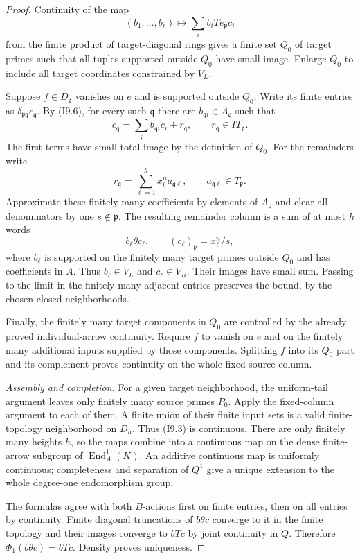 \begin{proof}
Continuity of the map
\[
 (b_1,\ldots,b_r)\longmapsto
          \sum_i b_i T e_{\mathfrak p}c_i
\]
from the finite product of target-diagonal rings gives a finite
set $Q_0$ of target primes such that all tuples supported outside
$Q_0$ have small image. Enlarge $Q_0$ to include all target
coordinates constrained by $V_L$.

Suppose $f\in D_{\mathfrak p}$ vanishes on $e$ and is supported
outside $Q_0$. Write its finite entries as
$\delta_{\mathfrak p\mathfrak q}c_{\mathfrak q}$.
By (I9.6), for every such $\mathfrak q$ there are
$b_{\mathfrak q i}\in A_{\mathfrak q}$ such that
\[
 c_{\mathfrak q}
    =\sum_i b_{\mathfrak q i}c_i+r_{\mathfrak q},
 \qquad r_{\mathfrak q}\in IT_{\mathfrak p}.              \tag{I9.7}
\]
The first terms have small total image by the definition of $Q_0$.
For the remainders write
\[
 r_{\mathfrak q}=\sum_{\ell=1}^h x_\ell^n a_{\mathfrak q\ell},
 \qquad a_{\mathfrak q\ell}\in T_{\mathfrak p}.
\]
Approximate these finitely many coefficients by elements of
$A_{\mathfrak p}$ and clear all denominators by one $s\notin
\mathfrak p$. The resulting remainder column is a sum of at most
$h$ words
\[
             b_\ell\theta c_\ell,\qquad
 (c_\ell)_{\mathfrak p}=x_\ell^n/s,
\]
where $b_\ell$ is supported on the finitely many target primes
outside $Q_0$ and has coefficients in $A$. Thus $b_\ell\in V_L$
and $c_\ell\in V_R$. Their images have small sum. Passing to the
limit in the finitely many adjacent entries preserves the bound,
by the chosen closed neighborhoods.

Finally, the finitely many target components in $Q_0$ are controlled
by the already proved individual-arrow continuity. Require $f$ to
vanish on $e$ and on the finitely many additional inputs supplied
by those components. Splitting $f$ into its $Q_0$ part and its
complement proves continuity on the whole fixed source column.

\emph{Assembly and completion.}
For a given target neighborhood, the uniform-tail argument leaves
only finitely many source primes $P_0$. Apply the fixed-column
argument to each of them. A finite union of their finite input
sets is a valid finite-topology neighborhood on $D_h$. Thus
(I9.3) is continuous. There are only finitely many heights $h$,
so the maps combine into a continuous map on the dense finite-arrow
subgroup of $\operatorname{End}_A^1(K)$. An additive continuous map
is uniformly continuous; completeness and separation of $Q^1$
give a unique extension to the whole degree-one endomorphism group.

The formulas agree with both $B$-actions first on finite entries,
then on all entries by continuity. Finite diagonal truncations of
$b\theta c$ converge to it in the finite topology and their
images converge to $bTc$ by joint continuity in $Q$. Therefore
$\Phi_1(b\theta c)=bTc$. Density proves uniqueness.
\end{proof}

